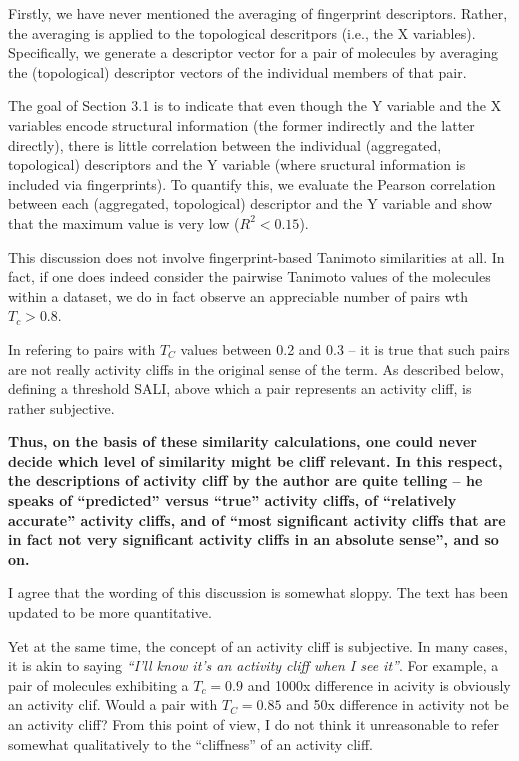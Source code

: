 \documentclass[letterpaper, 12pt]{article}
\begin{document}
Firstly, we have never mentioned the averaging of fingerprint descriptors. Rather, the averaging is
applied to the topological descritpors (i.e., the X variables). Specifically, we generate a
descriptor vector for a pair of molecules by averaging the (topological) descriptor vectors of the
individual members of that pair.

The goal of Section 3.1 is to indicate that even though the Y variable and the X variables encode
structural information (the former indirectly and the latter directly), there is little correlation
between the individual (aggregated, topological) descriptors and the Y variable (where sructural
information is included via fingerprints). To quantify this, we evaluate the Pearson correlation
between each (aggregated, topological) descriptor and the Y variable and show that the maximum value
is very low ($R^2 < 0.15$).

This discussion does not involve fingerprint-based Tanimoto similarities at all. In fact, if one
does indeed consider the pairwise Tanimoto values of the molecules within a dataset, we do in fact
observe an appreciable number of pairs wth $T_c > 0.8$.

In refering to pairs with $T_C$ values between 0.2 and 0.3 -- it is true that such pairs are not
really activity cliffs in the original sense of the term. As described below, defining a threshold
SALI, above which a pair represents an activity cliff, is rather subjective. 

\textbf{Thus, on the basis of these similarity calculations, one could never decide which level of
  similarity might be cliff relevant. In this respect, the descriptions of activity cliff by the
  author are quite telling – he speaks of “predicted” versus “true” activity cliffs, of “relatively
  accurate” activity cliffs, and of “most significant activity cliffs that are in fact not very
  significant activity cliffs in an absolute sense”, and so on. }

I agree that the wording of this discussion is somewhat sloppy. The text has been updated to be more
quantitative.

Yet at the same time, the concept of an activity cliff is subjective. In many cases, it is
akin to saying \emph{``I'll know it's an activity cliff when I see it''}. For example, a pair of
molecules exhibiting a $T_c = 0.9$ and 1000x difference in acivity is obviously an activity
clif. Would a pair with $T_C = 0.85$ and 50x difference in activity not be an activity cliff? From
this point of view, I do not think it unreasonable to refer somewhat qualitatively to the
``cliffness'' of an activity cliff.
\end{document}
